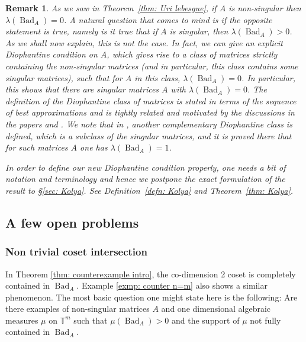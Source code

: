 \documentclass[reqno,11pt, twoside]{amsart}
\theoremstyle{plain}
\newtheorem{rem}[thm]{Remark}
\theoremstyle{definition}
\theoremstyle{definition}
\theoremstyle{remark}
\numberwithin{equation}{section}
\newcommand{\ignore}[1]{{}}
\newcommand{\lam}{\lambda}
\newcommand{\bT}{\mathbb{T}}
\newcommand\on[1]{\operatorname{#1}}
\begin{document}
\begin{rem}\label{rem: Kolya}
As we saw in Theorem~\ref{thm: Uri lebesgue}, if $A$ is non-singular then $\lam(\on{Bad}_A)=0$. A natural question that comes to mind is if
the opposite statement is true, namely is it true that if $A$ is
singular, then $\lam(\on{Bad}_A)>0$. As we shall now explain, this is not the case. In fact, we can give an explicit Diophantine condition 
on $A$, which gives rise to a class of matrices strictly containing the non-singular matrices (and in particular, this class contains some singular matrices), such that for $A$ in this class, $\lam(\on{Bad}_A)=0$. In particular, this shows that there are singular matrices $A$ with $\lam(\on{Bad}_A)=0$. The definition of the Diophantine class of matrices is stated in terms of the sequence of best
approximations and is tightly related and motivated by the discussions in the papers \cite{Mosh-welldistributed} and \cite{Kim-Kurzweil}. We note that in \cite{Kim-Kurzweil}, another complementary 
Diophantine class is defined, 
which is a subclass of the singular matrices, and it is proved there that for such matrices $A$ one has $\lam(\on{Bad}_A)=1$. 

In order to define our new Diophantine condition properly, one needs a bit of notation and terminology and hence we postpone the exact formulation of the result to \S\ref{sec: Kolya}. See Definition~\ref{defn: Kolya} and Theorem~\ref{thm: Kolya}.
\end{rem}
\subsection{A few open problems}
\ignore{
\subsubsection*{Characterizing singularity}
It is not clear to us if one can characterize the singularity of a 
matrix $A$ by the measure of $\on{Bad}_A$ with respect to various measures. 
We know from Theorem~\ref{thm: Uri lebesgue} that if $A$ is non-singular, then
$\lam_{\bT^m}(\on{Bad}_A)=0$. In \cite[Theorem 1.7]{Kim-Kurzweil} the author gives a non-trivial explicit 
Diophantine subclass of singular matrices  that satisfy 
$\lam_{\bT^m}(\on{Bad}_A)=1$. It is interesting to ask whether or not there exists singular matrices $A$ with 
$\lam_{\bT^m}(\on{Bad}_A)=0$. It seems to us that one might be able to provide a positive answer to this question using the techniques in \cite{Mosh-welldistributed}.
}
\subsubsection*{Non trivial coset intersection} In Theorem \ref{thm: counterexample intro}, the co-dimension 2 coset is completely contained in 
$\on{Bad}_A$. Example \ref{exmp: counter n=m} also shows a similar phenomenon. The most basic question one might state here is the following: Are there examples of non-singular matrices $A$ and one dimensional algebraic measures $\mu$ on $\bT^m$ such that $\mu(\on{Bad}_A)>0$ and the support of 
$\mu$ not fully contained in $\on{Bad}_A$. 
\end{document}
